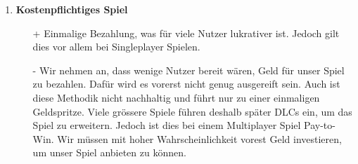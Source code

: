 \begin{itemize}
\begin{enumerate}
        \item \textbf{Kostenpflichtiges Spiel}
        \begin{itemize}
            \item[+] Einmalige Bezahlung, was für viele Nutzer lukrativer ist. Jedoch gilt dies vor allem bei Singleplayer Spielen.
            \item[-] Wir nehmen an, dass wenige Nutzer bereit wären, Geld für unser Spiel zu bezahlen.
                    Dafür wird es vorerst nicht genug ausgereift sein.
                    Auch ist diese Methodik nicht nachhaltig und führt nur zu einer einmaligen Geldspritze.
                    Viele grössere Spiele führen deshalb später
                    DLCs ein, um das Spiel zu erweitern.
                    Jedoch ist dies bei einem Multiplayer Spiel Pay-to-Win.
                    Wir müssen mit hoher Wahrscheinlichkeit vorest Geld investieren, um unser Spiel anbieten zu können.
        \end{itemize}
    \end{enumerate}
\end{itemize}

